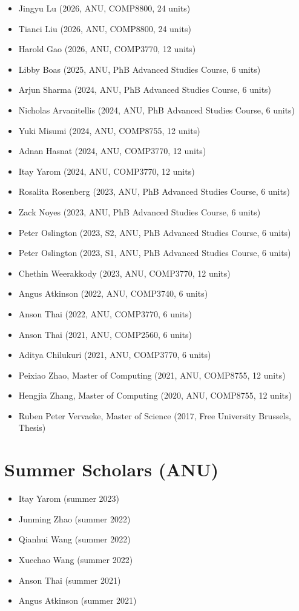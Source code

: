 \documentclass[singlecolumn,singlespace,11pt,a4paper]{article}
\begin{document}
\begin{itemize}
\item Jingyu Lu (2026, ANU, COMP8800, 24 units)
\item Tianci Liu (2026, ANU, COMP8800, 24 units)
\item Harold Gao (2026, ANU, COMP3770, 12 units)
\item Libby Boas (2025, ANU, PhB Advanced Studies Course, 6 units)
\item Arjun Sharma (2024, ANU, PhB Advanced Studies Course, 6 units)
\item Nicholas Arvanitellis (2024, ANU, PhB Advanced Studies Course, 6 units)
\item Yuki Misumi (2024, ANU, COMP8755, 12 units)
\item Adnan Hasnat (2024, ANU, COMP3770, 12 units)
\item Itay Yarom (2024, ANU, COMP3770, 12 units)
\item Rosalita Rosenberg (2023, ANU, PhB Advanced Studies Course, 6 units)
\item Zack Noyes (2023, ANU, PhB Advanced Studies Course, 6 units)
\item Peter Oslington (2023, S2, ANU, PhB Advanced Studies Course, 6 units)
\item Peter Oslington (2023, S1, ANU, PhB Advanced Studies Course, 6 units)
\item Chethin Weerakkody (2023, ANU, COMP3770, 12 units)
\item Angus Atkinson (2022, ANU, COMP3740, 6 units)
\item Anson Thai (2022, ANU, COMP3770, 6 units)
\item Anson Thai (2021, ANU, COMP2560, 6 units)
\item Aditya Chilukuri (2021, ANU, COMP3770, 6 units)
\item Peixiao Zhao, Master of Computing (2021, ANU, COMP8755, 12 units)
\item Hengjia Zhang, Master of Computing (2020, ANU, COMP8755, 12 units) 
\item Ruben Peter Vervaeke, Master of Science (2017, Free University Brussels, Thesis)

\end{itemize}

\section*{Summer Scholars (ANU)}

\begin{itemize}

\item Itay Yarom (summer 2023)
\item Junming Zhao (summer 2022)
\item Qianhui Wang (summer 2022)
\item Xuechao Wang (summer 2022)
\item Anson Thai (summer 2021)
\item Angus Atkinson (summer 2021)

\end{itemize}
\end{document}
